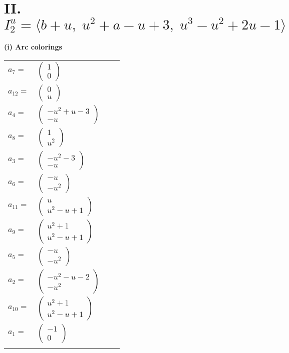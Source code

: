\documentclass[1p]{elsarticle_modified}
\theoremstyle{definition}
\begin{document}
\centering \section*{II. $I^u_{2}= \langle b+u,\;u^2+a- u+3,\;u^3- u^2+2 u-1 \rangle$}
\flushleft \textbf{(i) Arc colorings}\\
\begin{tabular}{m{7pt} m{180pt} m{7pt} m{180pt} }
\flushright $a_{7}=$&$\begin{pmatrix}1\\0\end{pmatrix}$ \\
\flushright $a_{12}=$&$\begin{pmatrix}0\\u\end{pmatrix}$ \\
\flushright $a_{4}=$&$\begin{pmatrix}- u^2+u-3\\- u\end{pmatrix}$ \\
\flushright $a_{8}=$&$\begin{pmatrix}1\\u^2\end{pmatrix}$ \\
\flushright $a_{3}=$&$\begin{pmatrix}- u^2-3\\- u\end{pmatrix}$ \\
\flushright $a_{6}=$&$\begin{pmatrix}- u\\- u^2\end{pmatrix}$ \\
\flushright $a_{11}=$&$\begin{pmatrix}u\\u^2- u+1\end{pmatrix}$ \\
\flushright $a_{9}=$&$\begin{pmatrix}u^2+1\\u^2- u+1\end{pmatrix}$ \\
\flushright $a_{5}=$&$\begin{pmatrix}- u\\- u^2\end{pmatrix}$ \\
\flushright $a_{2}=$&$\begin{pmatrix}- u^2- u-2\\- u^2\end{pmatrix}$ \\
\flushright $a_{10}=$&$\begin{pmatrix}u^2+1\\u^2- u+1\end{pmatrix}$ \\
\flushright $a_{1}=$&$\begin{pmatrix}-1\\0\end{pmatrix}$\\&\end{tabular}
\end{document}
